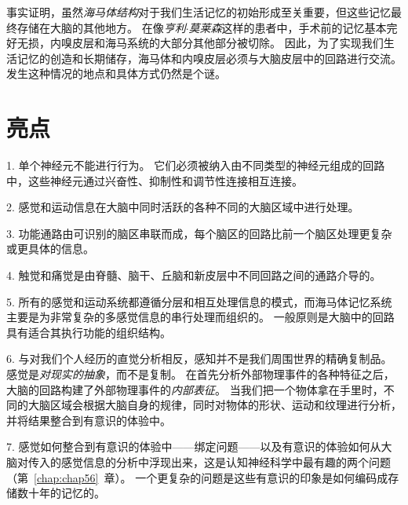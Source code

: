 事实证明，虽然\textit{海马体结构}对于我们生活记忆的初始形成至关重要，但这些记忆最终存储在大脑的其他地方。
在像\textit{亨利$\cdot$莫莱森}这样的患者中，手术前的记忆基本完好无损，内嗅皮层和海马系统的大部分其他部分被切除。
因此，为了实现我们生活记忆的创造和长期储存，海马体和内嗅皮层必须与大脑皮层中的回路进行交流。
发生这种情况的地点和具体方式仍然是个谜。



\section{亮点}

1. 单个神经元不能进行行为。
它们必须被纳入由不同类型的神经元组成的回路中，这些神经元通过兴奋性、抑制性和调节性连接相互连接。


2. 感觉和运动信息在大脑中同时活跃的各种不同的大脑区域中进行处理。


3. 功能通路由可识别的脑区串联而成，每个脑区的回路比前一个脑区处理更复杂或更具体的信息。


4. 触觉和痛觉是由脊髓、脑干、丘脑和新皮层中不同回路之间的通路介导的。


5. 所有的感觉和运动系统都遵循分层和相互处理信息的模式，而海马体记忆系统主要是为非常复杂的多感觉信息的串行处理而组织的。
一般原则是大脑中的回路具有适合其执行功能的组织结构。


6. 与对我们个人经历的直觉分析相反，感知并不是我们周围世界的精确复制品。
感觉是\textit{对现实的抽象}，而不是复制。
在首先分析外部物理事件的各种特征之后，大脑的回路构建了外部物理事件的\textit{内部表征}。
当我们把一个物体拿在手里时，不同的大脑区域会根据大脑自身的规律，同时对物体的形状、运动和纹理进行分析，并将结果整合到有意识的体验中。


7. 感觉如何整合到有意识的体验中——绑定问题——以及有意识的体验如何从大脑对传入的感觉信息的分析中浮现出来，这是认知神经科学中最有趣的两个问题（第~\ref{chap:chap56}~章）。
一个更复杂的问题是这些有意识的印象是如何编码成存储数十年的记忆的。
























